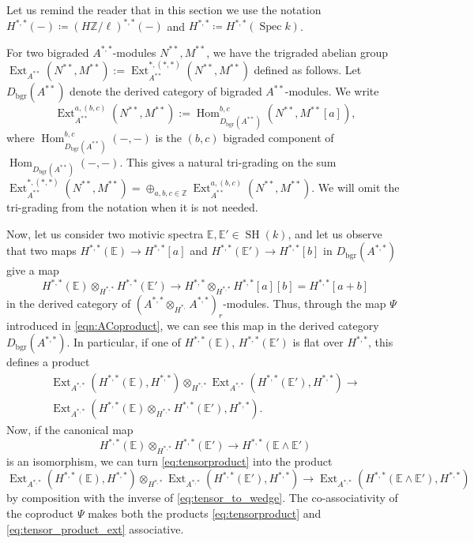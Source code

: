 \documentclass[10pt]{amsart}
\theoremstyle{definition}
\theoremstyle{plain}
\numberwithin{equation}{section}
\newcommand{\0}{\emptyset}
\newcommand{\E}{{\mathbb E}}
\newcommand{\Z}{{\mathbb Z}}
\newcommand{\Spec}{{\operatorname{Spec}}}
\newcommand{\SH}{{\operatorname{SH}}}
\newcommand{\Hom}{{\operatorname{Hom}}}
\newcommand{\Ext}{{\operatorname{Ext}}}
\begin{document}
Let us remind the reader that in this section we use the notation $H^{*,*}(-) \coloneqq (H\Z/\ell)^{*,*}(-)$ and $H^{*,*} \coloneqq H^{*,*}(\Spec k)$.

For two bigraded $A^{*,*}$-modules $N^{**}, M^{**}$, we have the trigraded abelian group  $\Ext_{A^{**}}(N^{**}, M^{**}):=\Ext_{A^{**}}^{*,(*,*)}(N^{**}, M^{**})$ defined as follows. Let $D_{\text{bgr}}(A^{**})$ denote the derived category of bigraded $A^{**}$-modules. We write $$\Ext_{A^{**}}^{a,(b,c)}(N^{**}, M^{**}):=\Hom_{D_{\text{bgr}}(A^{**})}^{b,c}(N^{**}, M^{**}[a]),$$
where $\Hom_{D_{\text{bgr}}(A^{**})}^{b,c}(-,-)$ is the $(b,c)$ bigraded component of $\Hom_{D_{\text{bgr}}(A^{**})}(-,-)$. This gives a natural tri-grading on the sum $\Ext_{A^{**}}^{*,(*,*)}(N^{**}, M^{**}) = \oplus_{a,b,c \in \Z}\Ext_{A^{**}}^{a,(b,c)}(N^{**}, M^{**})$. We will omit the tri-grading from the notation when it is not needed.

Now, let us consider two motivic spectra $\E,\E' \in \SH(k)$, and let us observe that two maps $H^{*,*}(\E) \to H^{*,*}[a]$ and $H^{*,*}(\E') \to H^{*,*}[b]$ in $D_{\text{bgr}}(A^{*,*})$ give a map 
$$H^{*,*}(\E) \otimes_{H^{*,*}}H^{*,*}(\E')\to H^{*,*} \otimes_{H^{*,*}}H^{*,*}[a][b]=H^{*,*}[a+b]$$
in the derived category of $(A^{*,*}\otimes_{H^{*,}}A^{*,*})_r$-modules. Thus, through the map $\Psi$ introduced in \eqref{eqn:ACoproduct}, we can see this map in the derived category $D_{\text{bgr}}(A^{*,*})$. In particular, if one of $H^{*,*}(\E)$, $H^{*,*}(\E')$ is flat over $H^{*,*}$, this defines a product
\begin{multline}
\label{eq:tensorproduct}
    \Ext_{A^{*,*}}(H^{*,*}(\E),H^{*,*})\otimes_{H^{*,*}}\Ext_{A^{*,*}}(H^{*,*}(\E'),H^{*,*}) \to \\ \Ext_{A^{*,*}}(H^{*,*}(\E)\otimes_{H^{*,*}}H^{*,*}(\E'),H^{*,*}).
\end{multline}
Now, if the canonical map
\begin{equation}
\label{eq:tensor_to_wedge}
    H^{*,*}(\E) \otimes_{H^{*,*}}H^{*,*}(\E') \to H^{*,*}(\E \wedge \E')
\end{equation}
is an isomorphism, we can turn \eqref{eq:tensorproduct} into the product
\begin{equation}
    \label{eq:tensor_product_ext}
    \Ext_{A^{*,*}}(H^{*,*}(\E),H^{*,*})\otimes_{H^{*,*}}\Ext_{A^{*,*}}(H^{*,*}(\E'),H^{*,*}) \to \Ext_{A^{*,*}}(H^{*,*}(\E \wedge \E'), H^{*,*})
\end{equation}
by composition with the inverse of \eqref{eq:tensor_to_wedge}. The co-associativity of the coproduct $\Psi$ makes both the products \eqref{eq:tensorproduct} and \eqref{eq:tensor_product_ext} associative.
\end{document}
